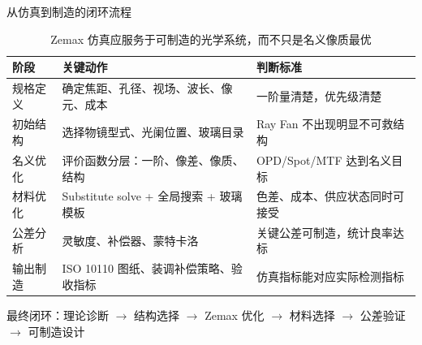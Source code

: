 \begin{frame}{从仿真到制造的闭环流程}\label{2.9}
    \small
    \begin{table}
        \centering
        \renewcommand{\arraystretch}{1.35}
        \begin{tabular}{p{2.5cm}|p{4.0cm}|p{4.0cm}}
            \toprule
            \textbf{阶段} & \textbf{关键动作} & \textbf{判断标准} \\
            \midrule
            规格定义 & 确定焦距、孔径、视场、波长、像元、成本 & 一阶量清楚，优先级清楚 \\
            初始结构 & 选择物镜型式、光阑位置、玻璃目录 & Ray Fan 不出现明显不可救结构 \\
            名义优化 & 评价函数分层：一阶、像差、像质、结构 & OPD/Spot/MTF 达到名义目标 \\
            材料优化 & Substitute solve + 全局搜索 + 玻璃模板 & 色差、成本、供应状态同时可接受 \\
            公差分析 & 灵敏度、补偿器、蒙特卡洛 & 关键公差可制造，统计良率达标 \\
            输出制造 & ISO 10110 图纸、装调补偿策略、验收指标 & 仿真指标能对应实际检测指标 \\
            \bottomrule
        \end{tabular}
        \caption{Zemax 仿真应服务于可制造的光学系统，而不只是名义像质最优}
        \label{tab:zemax_manufacturing_workflow}
    \end{table}

    \begin{center}
        \alert{最终闭环：理论诊断 $\rightarrow$ 结构选择 $\rightarrow$ Zemax 优化 $\rightarrow$ 材料选择 $\rightarrow$ 公差验证 $\rightarrow$ 可制造设计}
    \end{center}
\end{frame}
